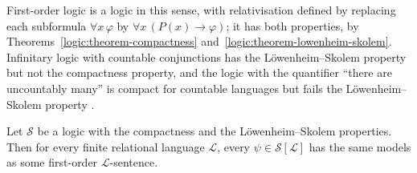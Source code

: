 First-order logic is a logic in this sense, with relativisation defined by replacing each subformula $\forall x\,\varphi$ by $\forall x\,(P(x) \to \varphi)$;
it has both properties, by Theorems~\ref{logic:theorem-compactness} and~\ref{logic:theorem-lowenheim-skolem}. Infinitary logic with countable conjunctions has
the L\"owenheim--Skolem property but not the compactness property, and the logic with the quantifier ``there are uncountably many'' is compact for countable
languages but fails the L\"owenheim--Skolem property \cite[Chapter XIII]{ebbinghaus-flum-thomas}.

\begin{theorem}[Lindstr\"om]\label{model-theory:theorem-lindstrom}
Let $\mathcal{S}$ be a logic with the compactness and the L\"owenheim--Skolem properties. Then for every finite relational language $\mathcal{L}$, every
$\psi \in \mathcal{S}[\mathcal{L}]$ has the same models as some first-order $\mathcal{L}$-sentence.
\end{theorem}


